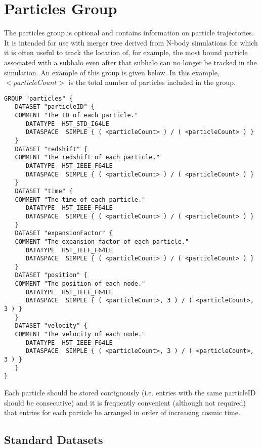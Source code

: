 \section{Particles Group}

The {\normalfont \ttfamily particles} group is optional and contains information on particle trajectories. It is intended for use with merger tree derived from N-body simulations for which it is often useful to track the location of, for example, the most bound particle associated with a subhalo even after that subhalo can no longer be tracked in the simulation. An example of this group is given below. In this example, {\normalfont \ttfamily $<particleCount>$} is the total number of particles included in the group.

\begin{verbatim}
GROUP "particles" {
   DATASET "particleID" {
   COMMENT "The ID of each particle."
      DATATYPE  H5T_STD_I64LE
      DATASPACE  SIMPLE { ( <particleCount> ) / ( <particleCount> ) }
   }
   DATASET "redshift" {
   COMMENT "The redshift of each particle."
      DATATYPE  H5T_IEEE_F64LE
      DATASPACE  SIMPLE { ( <particleCount> ) / ( <particleCount> ) }
   }
   DATASET "time" {
   COMMENT "The time of each particle."
      DATATYPE  H5T_IEEE_F64LE
      DATASPACE  SIMPLE { ( <particleCount> ) / ( <particleCount> ) }
   }
   DATASET "expansionFactor" {
   COMMENT "The expansion factor of each particle."
      DATATYPE  H5T_IEEE_F64LE
      DATASPACE  SIMPLE { ( <particleCount> ) / ( <particleCount> ) }
   }
   DATASET "position" {
   COMMENT "The position of each node."
      DATATYPE  H5T_IEEE_F64LE
      DATASPACE  SIMPLE { ( <particleCount>, 3 ) / ( <particleCount>, 3 ) }
   }
   DATASET "velocity" {
   COMMENT "The velocity of each node."
      DATATYPE  H5T_IEEE_F64LE
      DATASPACE  SIMPLE { ( <particleCount>, 3 ) / ( <particleCount>, 3 ) }
   }
}
\end{verbatim}

Each particle should be stored contiguously (i.e. entries with the same {\normalfont \ttfamily particleID} should be consecutive) and it is frequently convenient (although not required) that entries for each particle be arranged in order of increasing cosmic time.

\subsection{Standard Datasets}

